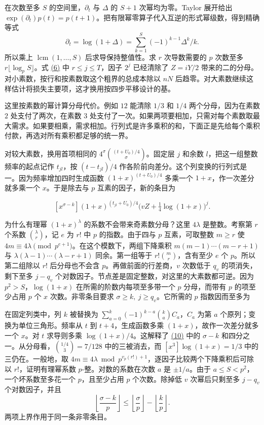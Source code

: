 \documentclass[11pt,a4paper]{article}
\begin{document}
在次数至多 \(S\) 的空间里，\(\partial_t\) 与 \(\Delta\) 的 \(S+1\) 次幂均为零。Taylor 展开给出 \(\exp(\partial_t)p(t)=p(t+1)\)。把有限幂零算子代入互逆的形式幂级数，得到精确等式 \[
 \partial_t=\log(1+\Delta)=\sum_{k=1}^{S}(-1)^{k-1}\Delta^k/k .
\] 所以乘上 \(\operatorname{lcm}(1,\ldots,S)\) 后求导保持整值性。求 \(r\) 次导数需要的 \(p\) 次数至多 \(r\lfloor\log_p S\rfloor\)。式 \hyperref[eq:6]{(6)} 中 \(r\le j\le T\)，因子 \(2^j\) 已经清除了 \(Z=iY/2\) 带来的二的分母。对小素数，按行和按素数取这个粗界的总成本除以 \(nN\) 后趋零。对大素数继续这样估计将损失主要项，这才换用按四步平移设计的基。

这里按素数的幂计算分母代价。例如 \(12\) 能清除 \(1/3\) 和 \(1/4\) 两个分母，因为在素数 \(2\) 处支付了两次，在素数 \(3\) 处支付了一次。如果两项要相加，只需对每个素数取最大需求。如果要相乘，需求相加。行列式是许多乘积的和，下面正是先给每个乘积付款，再选对所有乘积都足够的统一界。

对较大素数，换用首项相同的 \(4^\sigma\binom{(t+U_0)/4}{\sigma}\)。固定层 \(j\) 和余数 \(l\)，把这一组整数频率的起点记作 \(t_{jl}\)，按 \((t-t_{jl})/4\) 作各阶前向差分。这个列变换的行列式是一。因为频率增加四时生成函数 \((1+x)^{(t+U_0)/4}\) 多乘一个 \(1+x\)，作一次差分就多乘一个 \(x\)。于是除去与 \(p\) 互素的因子，新的条目为

\[
 [x^{\sigma-k}](1+x)^{(t_{jl}+U_0)/4}
        \big(vZ+\tfrac14\log(1+x)\big)^j .                               \tag{10}\label{eq:10}
\]

为什么有理幂 \((1+x)^\lambda\) 的系数不会带来奇素数分母？这里 \(4\lambda\) 是整数。考察第 \(r\) 个系数 \(\binom{\lambda}{r}\)，记 \(e\) 为 \(r!\) 中 \(p\) 的指数。由于四与 \(p\) 互素，可取整数 \(m\ge r\) 使 \(4m\equiv4\lambda\pmod{p^{e+1}}\)。在这个模数下，两组下降乘积 \(m(m-1)\cdots(m-r+1)\) 与 \(\lambda(\lambda-1)\cdots(\lambda-r+1)\) 同余。第一组等于 \(r!\binom mr\)，含有至少 \(e\) 个 \(p\)。所以第二组除以 \(r!\) 后分母也不会含 \(p\)。再做前面的行差商，\(v\) 次数低于 \(q_v\) 的项消失，剩下至多 \(j-q_v\) 个对数因子。节点差是固定整数，对这里的大素数都可逆。因为 \(p^2>S\)，\(\log(1+x)\) 在所需的阶数内每项至多带一个 \(p\) 分母，而带有 \(p\) 的项至少占用 \(p\) 个 \(x\) 次数。非零条目要求 \(\sigma\ge k,\ j\ge q_v\)。它所需的 \(p\) 指数因而至多为

在固定列类中，列 \(k\) 被替换为 \(\sum_{a=0}^k(-1)^{k-a}\binom ka C_a\)，\(C_a\) 为第 \(a\) 个原列；变换为单位三角形。频率从 \(t\) 到 \(t+4\)，生成函数多乘 \((1+x)\)，故作一次差分就多一个 \(x\)。对 \(t\) 求导则多乘 \(\log(1+x)/4\)。这解释了 \hyperref[eq:10]{(10)} 中的 \(\sigma-k\) 和四分之一。从分母看，\(\binom{1/4}{3}=7/128\) 中的三被消去，而 \([x^3]\log(1+x)=1/3\) 中的三仍在。一般地，取 \(4m\equiv4\lambda\bmod p^{v_p(r!)+1}\)，逐因子比较两个下降乘积后可除以 \(r!\)，证明有理幂系数 \(p\)-整。对数的系数在次数 \(a\) 是 \(\pm1/a\)。由于 \(a\le S<p^2\)，一个坏系数至多花一个 \(p\)，且至少占用 \(p\) 个次数。除掉低 \(v\) 次幂后只剩至多 \(j-q_v\) 个对数因子，并且 \[
 \left\lfloor\frac{\sigma-k}{p}\right\rfloor
 \le \left\lfloor\frac{\sigma}{p}\right\rfloor-\left\lfloor\frac{k}{p}\right\rfloor .
\] 两项上界作用于同一条非零条目。
\end{document}
